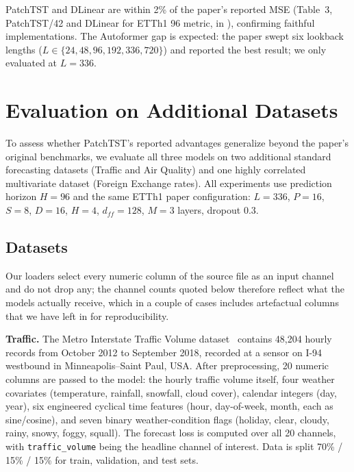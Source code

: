 \documentclass[11pt]{article}
\begin{document}
PatchTST and DLinear are within 2\% of the paper's reported MSE (Table~3,
PatchTST/42 and DLinear for ETTh1 96 metric, in \cite{patchtst}), confirming
faithful implementations. The Autoformer gap is expected: the paper swept six
lookback lengths ($L \in \{24, 48, 96, 192, 336, 720\}$) and reported the best
result; we only evaluated at $L{=}336$.

\section{Evaluation on Additional Datasets}
\label{sec:evaluation}

To assess whether PatchTST's reported advantages generalize beyond the paper's original benchmarks, we evaluate all three models on two additional standard forecasting datasets (Traffic and Air Quality) and one highly correlated multivariate dataset (Foreign Exchange rates). All experiments use prediction horizon $H{=}96$ and the same ETTh1 paper configuration: $L{=}336$, $P{=}16$, $S{=}8$, $D{=}16$, $H{=}4$, $d_{ff}{=}128$, $M{=}3$ layers, dropout 0.3.

\subsection{Datasets}

Our loaders select every numeric column of the source file as an input channel and do not drop any; the channel counts quoted below therefore reflect what the models actually receive, which in a couple of cases includes artefactual columns that we have left in for reproducibility.

\textbf{Traffic.} The Metro Interstate Traffic Volume dataset~\cite{traffic_dataset} contains 48,204 hourly records from October 2012 to September 2018, recorded at a sensor on I-94 westbound in Minneapolis--Saint Paul, USA. After preprocessing, 20 numeric columns are passed to the model: the hourly traffic volume itself, four weather covariates (temperature, rainfall, snowfall, cloud cover), calendar integers (day, year), six engineered cyclical time features (hour, day-of-week, month, each as sine/cosine), and seven binary weather-condition flags (holiday, clear, cloudy, rainy, snowy, foggy, squall). The forecast loss is computed over all 20 channels, with \texttt{traffic\_volume} being the headline channel of interest. Data is split 70\% / 15\% / 15\% for train, validation, and test sets.
\end{document}
